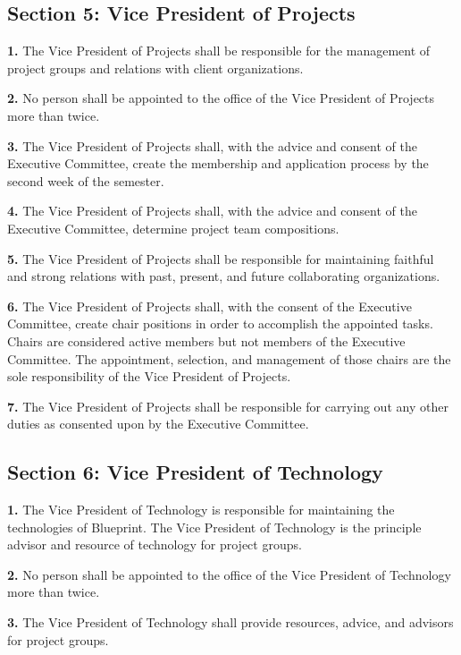 \documentclass{article}
\begin{document}
\subsection{Section 5: Vice President of Projects}

\textbf{1.} The Vice President of Projects shall be responsible for the management of project groups and relations with client organizations.

\textbf{2.} No person shall be appointed to the office of the Vice President of Projects more than twice.

\textbf{3.} The Vice President of Projects shall, with the advice and consent of the Executive Committee, create the membership and application process by the second week of the semester.

\textbf{4.} The Vice President of Projects shall, with the advice and consent of the Executive Committee, determine project team compositions.

\textbf{5.} The Vice President of Projects shall be responsible for maintaining faithful and strong relations with past, present, and future collaborating organizations.

\textbf{6.} The Vice President of Projects shall, with the consent of the Executive Committee, create chair positions in order to accomplish the appointed tasks. Chairs are considered active members but not members of the Executive Committee. The appointment, selection, and management of those chairs are the sole responsibility of the Vice President of Projects.

\textbf{7.} The Vice President of Projects shall be responsible for carrying out any other duties as consented upon by the Executive Committee.

\subsection{Section 6: Vice President of Technology}

\textbf{1.} The Vice President of Technology is responsible for maintaining the technologies of Blueprint. The Vice President of Technology is the principle advisor and resource of technology for project groups.

\textbf{2.} No person shall be appointed to the office of the Vice President of Technology more than twice.

\textbf{3.} The Vice President of Technology shall provide resources, advice, and advisors for project groups.
\end{document}
